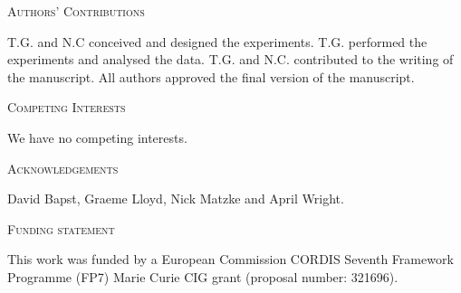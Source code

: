 \documentclass[12pt,letterpaper]{article}
\renewcommand{\section}[1]{%
\bigskip
\begin{center}
\begin{Large}
\normalfont\scshape #1
\medskip
\end{Large}
\end{center}}
\begin{document}
\section{Authors' Contributions}
T.G. and N.C conceived and designed the experiments. T.G. performed the experiments and analysed the data. T.G. and N.C. contributed to the writing of the manuscript. All authors approved the final version of the manuscript.
\section{Competing Interests}
We have no competing interests.
\section{Acknowledgements}
David Bapst, Graeme Lloyd, Nick Matzke and April Wright.
\section{Funding statement}
This work was funded by a European Commission CORDIS Seventh Framework Programme (FP7) Marie Curie CIG grant (proposal number: 321696).




\newcommand{\beginsupplement}{%
    \setcounter{table}{0}
    \renewcommand{\thetable}{S\arabic{table}}%
    \setcounter{figure}{0}
    \renewcommand{\thefigure}{S\arabic{figure}}%
}
\beginsupplement
%


\end{document}
